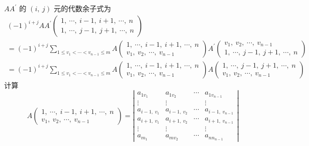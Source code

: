 \begin{solution}
	$A A^{\prime} $ 的 $ (i,\  j) $ 元的代数余子式为
	$$\begin{array}{l}
		(-1)^{i+j} A A^{\prime}\left(\begin{array}{l}
			1,\  \cdots,\  i-1,\  i+1,\  \cdots,\  n \\
			1,\  \cdots,\  j-1,\  j+1,\  \cdots,\  n
		\end{array}\right) \\
		=(-1)^{i+j} \sum_{1 \leqslant v_{1}<\cdots<v_{n-1} \leqslant m} A\left(\begin{array}{l}
			1,\  \cdots,\  i-1,\  i+1,\  \cdots,\  n \\
			v_{1},\  v_{2},\  \cdots,\  v_{n-1}
		\end{array}\right) A^{\prime}\left(\begin{array}{l}
			v_{1},\  v_{2},\  \cdots,\  v_{n-1} \\
			1,\  \cdots,\  j-1,\  j+1,\  \cdots,\  n
		\end{array}\right) \\
		=(-1)^{i+j} \sum_{1 \leqslant v_{1}<\cdots<v_{n-1} \leqslant m} A\left(\begin{array}{l}
			1,\  \cdots,\  i-1,\  i+1,\  \cdots,\  n \\
			v_{1},\  v_{2},\  \cdots,\  v_{n-1}
		\end{array}\right) A\left(\begin{array}{l}
			1,\  \cdots,\  j-1,\  j+1,\  \cdots,\  n \\
			v_{1},\  v_{2},\  \cdots,\  v_{n-1}
		\end{array}\right)
	\end{array}$$
	计算
	$$	A\left(\begin{array}{l}
		1,\  \cdots,\  i-1,\  i+1,\  \cdots,\  n \\
		v_{1},\  v_{2},\  \cdots,\  v_{n-1}
	\end{array}\right)=\left|\begin{array}{cccc}
		a_{1 v_{1}} & a_{1 v_{2}} & \cdots & a_{1 v_{n-1}} \\
		\vdots & \vdots & & \vdots \\
		a_{i-1,\  v_{1}} & a_{i-1,\  v_{2}} & \cdots & a_{i-1,\  v_{n-1}} \\
		a_{i+1,\  v_{1}} & a_{i+1,\  v_{2}} & \cdots & a_{i+1,\  v_{n-1}} \\
		\vdots & \vdots & & \vdots \\
		a_{m_{1}} & a_{m v_{2}} & \cdots & a_{n n_{n-1}}
	\end{array}\right|$$

\end{solution}
